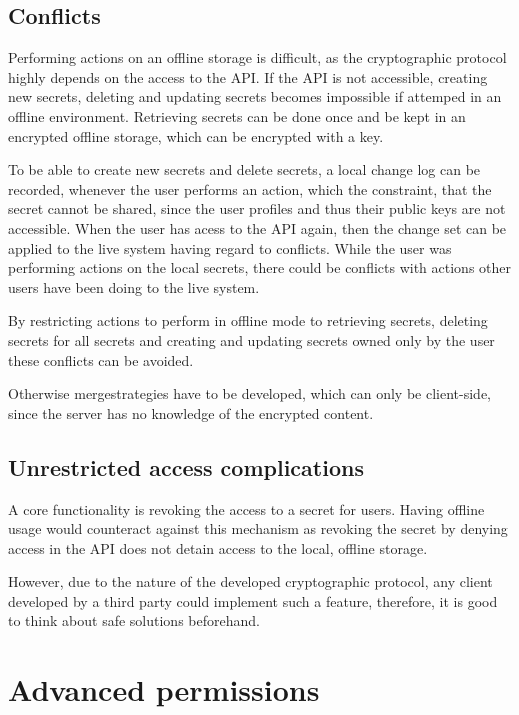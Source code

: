 \subsection{Conflicts}

Performing actions on an offline storage is difficult, as the cryptographic
protocol highly depends on the access to the API. If the API is not accessible,
creating new secrets, deleting and updating secrets becomes impossible if
attemped in an offline environment. Retrieving secrets can be done once and be
kept in an encrypted offline storage, which can be encrypted with a key.

To be able to create new secrets and delete secrets, a local change log can be
recorded, whenever the user performs an action, which the constraint, that the
secret cannot be shared, since the user profiles and thus their public keys are
not accessible. When the user has acess to the API again, then the change set
can be applied to the live system having regard to conflicts. While the user
was performing actions on the local secrets, there could be conflicts with
actions other users have been doing to the live system.

By restricting actions to perform in offline mode to retrieving secrets,
deleting secrets for all secrets and creating and updating secrets owned only
by the user these conflicts can be avoided.

Otherwise mergestrategies have to be developed, which can only be client-side,
since the server has no knowledge of the encrypted content.

\subsection{Unrestricted access complications}

A core functionality is revoking the access to a secret for users. Having
offline usage would counteract against this mechanism as revoking the secret by
denying access in the API does not detain access to the local, offline storage.

However, due to the nature of the developed cryptographic protocol, any client
developed by a third party could implement such a feature, therefore, it is
good to think about safe solutions beforehand.

\section{Advanced permissions}


